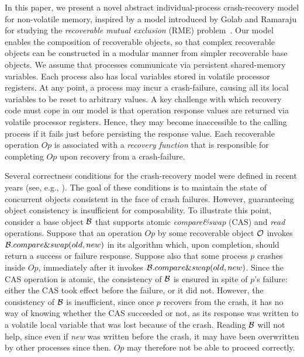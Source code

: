 In this paper, we present a novel abstract individual-process crash-recovery model for non-volatile memory, inspired by a model introduced by Golab and Ramaraju for studying the \emph{recoverable mutual exclusion} (RME) problem~\cite{GolabR16}. Our model enables the composition of recoverable objects, so that complex recoverable objects can be constructed in a modular manner from simpler recoverable base objects.
We assume that processes communicate via persistent shared-memory variables.
Each process also has local variables stored in volatile processor registers. At any point, a process may incur a crash-failure, causing all its local variables to be reset to arbitrary values.
A key challenge with which recovery code must cope in our model is
that operation response values are returned via volatile
processor registers. Hence, they may become inaccessible to the calling process if it fails just before persisting the response value. Each recoverable operation $Op$ is associated with a \emph{recovery function} that is responsible for completing $Op$ upon recovery from a crash-failure.


Several correctness conditions for the crash-recovery model were defined in recent years (see, e.g., \cite{Aguilera2003StrictLA,DBLP:conf/opodis/BerryhillGT15,DBLP:conf/icdcs/GuerraouiL04,DBLP:conf/wdag/IzraelevitzMS16}). The goal of these conditions is to maintain the state of concurrent objects consistent in the face of crash failures. However,
guaranteeing object consistency is insufficient for composability.
To illustrate this point, consider a base object $\cal{B}$ that supports 
atomic \emph{compare\&swap} (CAS) and \emph{read} operations.
Suppose that an operation $Op$ by some recoverable object $\cal{O}$ invokes ${\cal{B}}.compare\&swap(old,new)$
in its algorithm which, upon completion,
should return a success or failure response.
Suppose also that some process $p$ crashes inside $Op$, immediately after it invokes
${\cal{B}}.compare\&swap(old,new)$.
Since the CAS operation is atomic, the consistency of ${\cal{B}}$ is ensured in
spite of $p$'s failure: either the CAS took effect before the failure, or it did not. 
However, the consistency of ${\cal{B}}$ is insufficient, since once $p$ recovers from the 
crash, it has no way of knowing whether the CAS succeeded or not, as its response was written to a volatile local variable that was lost because of the crash. Reading ${\cal{B}}$ will not help, since even if \emph{new} was written before the crash, it may have been overwritten by other processes since then. $Op$   may therefore not be able to proceed correctly.

